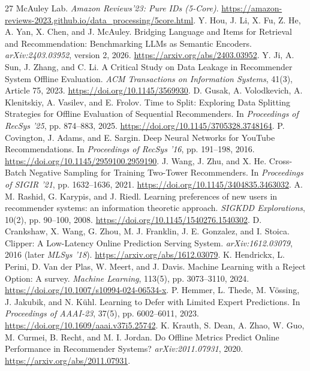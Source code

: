 \documentclass[11pt]{article}
\begin{document}
\begin{thebibliography}{27}
 McAuley Lab. \emph{Amazon Reviews'23: Pure IDs (5-Core)}. \url{https://amazon-reviews-2023.github.io/data_processing/5core.html}.
 Y. Hou, J. Li, X. Fu, Z. He, A. Yan, X. Chen, and J. McAuley. Bridging Language and Items for Retrieval and Recommendation: Benchmarking LLMs as Semantic Encoders. \emph{arXiv:2403.03952}, version 2, 2026. \url{https://arxiv.org/abs/2403.03952}.
 Y. Ji, A. Sun, J. Zhang, and C. Li. A Critical Study on Data Leakage in Recommender System Offline Evaluation. \emph{ACM Transactions on Information Systems}, 41(3), Article 75, 2023. \url{https://doi.org/10.1145/3569930}.
 D. Gusak, A. Volodkevich, A. Klenitskiy, A. Vasilev, and E. Frolov. Time to Split: Exploring Data Splitting Strategies for Offline Evaluation of Sequential Recommenders. In \emph{Proceedings of RecSys '25}, pp. 874--883, 2025. \url{https://doi.org/10.1145/3705328.3748164}.
 P. Covington, J. Adams, and E. Sargin. Deep Neural Networks for YouTube Recommendations. In \emph{Proceedings of RecSys '16}, pp. 191--198, 2016. \url{https://doi.org/10.1145/2959100.2959190}.
 J. Wang, J. Zhu, and X. He. Cross-Batch Negative Sampling for Training Two-Tower Recommenders. In \emph{Proceedings of SIGIR '21}, pp. 1632--1636, 2021. \url{https://doi.org/10.1145/3404835.3463032}.
 A. M. Rashid, G. Karypis, and J. Riedl. Learning preferences of new users in recommender systems: an information theoretic approach. \emph{SIGKDD Explorations}, 10(2), pp. 90--100, 2008. \url{https://doi.org/10.1145/1540276.1540302}.
 D. Crankshaw, X. Wang, G. Zhou, M. J. Franklin, J. E. Gonzalez, and I. Stoica. Clipper: A Low-Latency Online Prediction Serving System. \emph{arXiv:1612.03079}, 2016 (later \emph{MLSys '18}). \url{https://arxiv.org/abs/1612.03079}.
 K. Hendrickx, L. Perini, D. Van der Plas, W. Meert, and J. Davis. Machine Learning with a Reject Option: A survey. \emph{Machine Learning}, 113(5), pp. 3073--3110, 2024. \url{https://doi.org/10.1007/s10994-024-06534-x}.
 P. Hemmer, L. Thede, M. V\"ossing, J. Jakubik, and N. K\"uhl. Learning to Defer with Limited Expert Predictions. In \emph{Proceedings of AAAI-23}, 37(5), pp. 6002--6011, 2023. \url{https://doi.org/10.1609/aaai.v37i5.25742}.
 K. Krauth, S. Dean, A. Zhao, W. Guo, M. Curmei, B. Recht, and M. I. Jordan. Do Offline Metrics Predict Online Performance in Recommender Systems? \emph{arXiv:2011.07931}, 2020. \url{https://arxiv.org/abs/2011.07931}.

\end{thebibliography}
\end{document}
